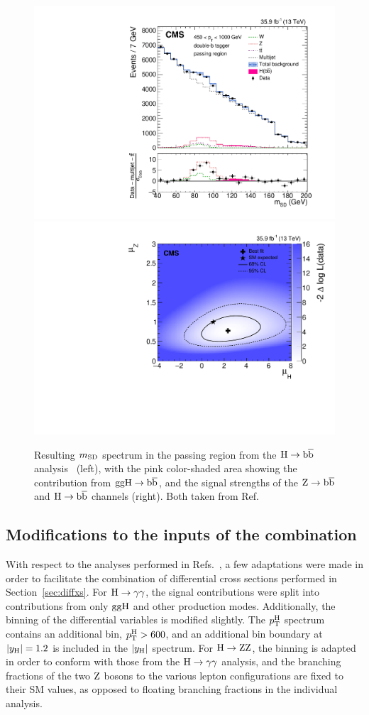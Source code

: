 \begin{figure}[hbtp]
  \begin{center}
    \includegraphics[width=0.49\linewidth]{img/inputs/hbb/msd.pdf}
    \includegraphics[width=0.49\linewidth]{img/inputs/hbb/signalstrengths.pdf}
    \caption{
        Resulting $m_\mathrm{SD}$ spectrum in the passing region from the $\mathrm{H}\to\mathrm{b}\overline{\mathrm{b}}$ analysis~\cite{Sirunyan:2017dgc} (left), with the pink color-shaded area showing the contribution from $\mathrm{g}\mathrm{g}\mathrm{H}\to\mathrm{b}\overline{\mathrm{b}}$, and the signal strengths of the $\mathrm{Z}\to\mathrm{b}\overline{\mathrm{b}}$ and $\mathrm{H}\to\mathrm{b}\overline{\mathrm{b}}$ channels (right).
        Both taken from Ref.~\cite{Sirunyan:2017dgc}
        }
    \label{fig:hbbresults}
  \end{center}
\end{figure}



\subsection{Modifications to the inputs of the combination}

With respect to the analyses performed in Refs.~\cite{Sirunyan:2018kta,Sirunyan:2017exp,Sirunyan:2017dgc}, a few adaptations were made in order to facilitate the combination of differential cross sections performed in Section~\ref{sec:diffxs}.
% 
For $\mathrm{H}\to\mathrm{\gamma}\mathrm{\gamma}$, the signal contributions were split into contributions from only $\mathrm{g}\mathrm{g}\mathrm{H}$ and other production modes.
% 
Additionally, the binning of the differential variables is modified slightly.
% 
The $p_\mathrm{T}^\mathrm{H}$ spectrum contains an additional bin, $p_\mathrm{T}^\mathrm{H}>600$\GeV, and an additional bin boundary at $\left|y_\mathrm{H}\right|  = 1.2$ is included in the $\left|y_\mathrm{H}\right| $ spectrum.
% 
For $\mathrm{H}\to\mathrm{Z}\mathrm{Z}$, the binning is adapted in order to conform with those from the $\mathrm{H}\to\mathrm{\gamma}\mathrm{\gamma}$ analysis, and the branching fractions of the two $\mathrm{Z}$ bosons to the various lepton configurations are fixed to their SM values, as opposed to floating branching fractions in the individual analysis.

